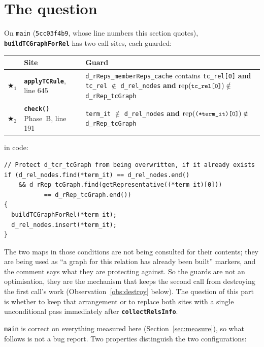 \documentclass[11pt,a4paper]{article}
\newcommand{\code}[1]{\texttt{\small #1}}
\newcommand{\fn}[1]{\texttt{\small\bfseries #1}}
\newcommand{\rep}[1]{\mathrm{rep}(#1)}
\theoremstyle{definition}
\begin{document}
\section{The question}

On \code{main} (\code{5cc03f4b9}, whose line numbers this section quotes),
\fn{buildTCGraphForRel} has two call sites, each guarded:

\begin{center}\small
\begin{tabular}{@{}llp{7.4cm}@{}}
\toprule
& Site & Guard\\
\midrule
$\bigstar_1$ & \fn{applyTCRule}, line 645 &
  \code{d\_rReps\_memberReps\_cache} contains \code{tc\_rel[0]}
  \textbf{and} \code{tc\_rel} $\notin$ \code{d\_rel\_nodes}
  \textbf{and} $\rep{\code{tc\_rel[0]}} \notin$ \code{d\_rRep\_tcGraph}\\
$\bigstar_2$ & \fn{check()} Phase~B, line 191 &
  \code{*term\_it} $\notin$ \code{d\_rel\_nodes}
  \textbf{and} $\rep{\code{(*term\_it)[0]}} \notin$ \code{d\_rRep\_tcGraph}\\
\bottomrule
\end{tabular}
\end{center}

\noindent
in code:

\begin{lstlisting}
// Protect d_tcr_tcGraph from being overwritten, if it already exists
if (d_rel_nodes.find(*term_it) == d_rel_nodes.end()
    && d_rRep_tcGraph.find(getRepresentative((*term_it)[0]))
           == d_rRep_tcGraph.end())
{
  buildTCGraphForRel(*term_it);
  d_rel_nodes.insert(*term_it);
}
\end{lstlisting}

\noindent
The two maps in those conditions are not being consulted for their contents;
they are being used as ``a graph for this relation has already been built''
markers, and the comment says what they are protecting against. So the guards
are not an optimisation, they are the mechanism that keeps the second call from
destroying the first call's work (Observation~\ref{obs:destroy} below). The
question of this part is whether to keep that arrangement or to replace both
sites with a single unconditional pass immediately after \fn{collectRelsInfo}.

\code{main} is correct on everything measured here
(Section~\ref{sec:measure}), so what follows is not a bug report. Two properties
distinguish the two configurations:
\end{document}

